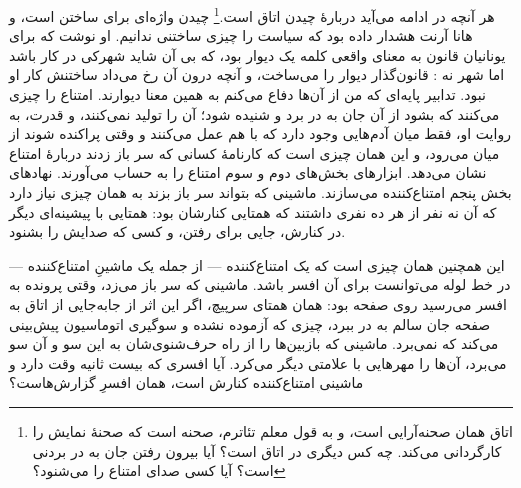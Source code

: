 هر آنچه در ادامه می‌آید دربارهٔ چیدن اتاق است.\footnote{اتاق همان صحنه‌آرایی است، و به قول معلم تئاترم، صحنه است که صحنهٔ نمایش را کارگردانی می‌کند. چه کس دیگری در اتاق است؟ آیا بیرون رفتن جان به در بردنی است؟ آیا کسی صدای امتناع را می‌شنود؟} چیدن واژه‌ای برای ساختن است، و هانا آرنت هشدار داده بود که سیاست را چیزی ساختنی ندانیم. او نوشت که برای یونانیان قانون به معنای واقعی کلمه یک دیوار بود، که بی آن شاید شهرکی در کار باشد اما شهر نه \autocite{arendt1958human}: قانون‌گذار دیوار را می‌ساخت، و آنچه درون آن رخ می‌داد ساختنش کار او نبود. تدابیر پایه‌ای که من از آن‌ها دفاع می‌کنم به همین معنا دیوارند. امتناع را چیزی می‌کنند که بشود از آن جان به در برد و شنیده شود؛ آن را تولید نمی‌کنند، و قدرت، به روایت او، فقط میان آدم‌هایی وجود دارد که با هم عمل می‌کنند و وقتی پراکنده شوند از میان می‌رود، و این همان چیزی است که کارنامهٔ کسانی که سر باز زدند دربارهٔ امتناع نشان می‌دهد. ابزارهای بخش‌های دوم و سوم امتناع را به حساب می‌آورند. نهادهای بخش پنجم امتناع‌کننده می‌سازند. ماشینی که بتواند سر باز بزند به همان چیزی نیاز دارد که آن نه نفر از هر ده نفری داشتند که همتایی کنارشان بود: همتایی با پیشینه‌ای دیگر در کنارش، جایی برای رفتن، و کسی که صدایش را بشنود.

این همچنین همان چیزی است که یک امتناع‌کننده — از جمله یک ماشینِ امتناع‌کننده — در خط لوله می‌توانست برای آن افسر باشد. ماشینی که سر باز می‌زد، وقتی پرونده به افسر می‌رسید روی صفحه بود: همان همتای سرپیچ، اگر این اثر از جابه‌جایی از اتاق به صفحه جان سالم به در ببرد، چیزی که آزموده نشده و سوگیری اتوماسیون پیش‌بینی می‌کند که نمی‌برد. ماشینی که بازبین‌ها را از راه حرف‌شنوی‌شان به این سو و آن سو می‌برد، آن‌ها را مهرهایی با علامتی دیگر می‌کرد. آیا افسری که بیست ثانیه وقت دارد و ماشینی امتناع‌کننده کنارش است، همان افسرِ گزارش‌هاست؟
